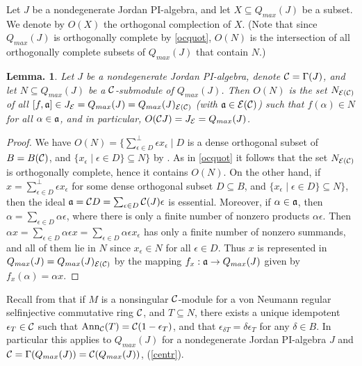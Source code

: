 \documentclass[a4paper,twoside,11pt]{article}
\theoremstyle{plain}
\theoremstyle{miestilo}
\newtheorem{lema}[subsection]{Lemma.}
\theoremstyle{misnotas}
\begin{document}
Let $J$ be a nondegenerate Jordan PI-algebra, and let $X \subseteq Q_{max}(J)$ be a
subset. We denote by $O(X)$ the orthogonal complection of $X$. (Note that since
$Q_{max}(J)$ is orthogonally complete by \ref{ocquot}, $O(N)$ is the
intersection of all orthogonally complete subsets of $Q_{max}(J)$ that contain
$N$.)

\begin{lema}\label{oocc}Let $J$ be a nondegenerate Jordan PI-algebra, denote $\mathcal C = \Gamma(J)$,
and let $N \subseteq Q_{max}(J)$ be a $\mathcal C$-submodule of $Q_{max}(J)$. Then $O(N)$ is the
set $N_{{\cal E}(\mathcal C)}$ of all $[f,\frak a]\in J_\mathcal E = Q_{max}(J)= Q_{max}(J)_{{\cal E}(\mathcal C)}$
(with $\frak a \in {\cal E}(\mathcal C)$) such that $f(\alpha)\in N$ for all
$\alpha \in \frak a$, and in particular, $O(\mathcal C J) = J_\mathcal E = Q_{max}(J)$.\end{lema}

\begin{proof} We have $O(N) = \{\sum^\perp_{\epsilon \in D}\epsilon x_\epsilon\mid D$ is a dense
orthogonal subset of $B= B(\mathcal C)$, and $\{x_\epsilon \mid \epsilon \in D\} \subseteq N\}$ by
\cite[3.1.14]{bmami}. As in \ref{ocquot} it follows that the set $N_{{\cal E}(\mathcal C)}$ is
orthogonally complete, hence it contains
$O(N)$. On the other hand, if $x = \sum^\perp_{\epsilon \in D}\epsilon x_\epsilon$ for some
dense orthogonal subset $D \subseteq B$, and $\{x_\epsilon \mid \epsilon \in D\} \subseteq
N\}$, then the ideal $\frak a = \mathcal C D = \sum_{\epsilon \in D}\mathcal C(J)\epsilon$ is
essential. Moreover, if $\alpha \in \frak a$, then $\alpha = \sum_{\epsilon \in
D}\alpha\epsilon$, where there is only a finite number of nonzero products $\alpha\epsilon$.
Then $\alpha x = \sum_{\epsilon \in D}\alpha\epsilon x = \sum_{\epsilon \in D}\alpha\epsilon
x_\epsilon$ has only a finite number of nonzero summands, and all of them lie in $N$ since
$x_\epsilon \in N$ for all $\epsilon \in D$. Thus $x$ is represented in $Q_{max}(J) =
Q_{max}(J)_{{\cal E}(\mathcal C)}
$ by the mapping $f_x: \frak a\rightarrow Q_{max}(J)$ given by $f_x(\alpha)=
\alpha x$.\end{proof}

Recall from \cite[3.1.1]{bmami} that if $M$ is a nonsingular $\mathcal C$-module for a von Neumann regular
selfinjective  commutative ring $\mathcal C$, and $T\subseteq N$, there exists a unique idempotent
$\epsilon_T \in \mathcal C$ such that ${\rm Ann}_\mathcal C(T) = \mathcal C (1-\epsilon_T)$, and that
$\epsilon_{\delta T} = \delta\epsilon_T$ for any $\delta \in B$. In particular this applies
to $Q_{max}(J)$ for a nondegenerate Jordan PI-algebra $J$ and $\mathcal C = \Gamma(Q_{max}(J)) =
\mathcal C(Q_{max}(J))$, (\ref{centr}).
\end{document}
